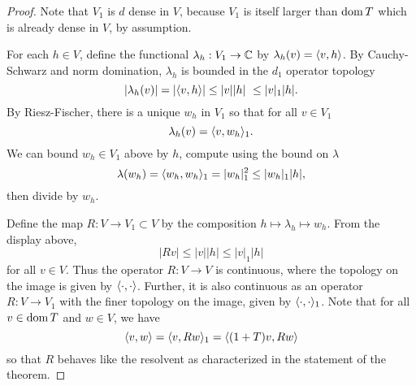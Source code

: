 \documentclass[11pt]{amsart}
\begin{document}
\begin{proof}
		Note that $V_1$ is $d$ dense in $V$, because $V_1$ is itself larger than $\operatorname{dom} T$ which is already dense in $V$, by assumption.
		
		For each $h\in V$, define the functional $\lambda_h: V_1 \to \mathbb{C}$ by $\lambda_h(v)=\langle v, h \rangle$. By Cauchy-Schwarz and norm domination, $\lambda_h$ is bounded in the $d_1$ operator topology
			\begin{equation*}
				|\lambda_h(v)|=|\langle v, h \rangle| \leq |v| |h|\ \leq |v|_1 |h|.
			\end{equation*}
		By Riesz-Fischer, there is a unique $w_h$ in $V_1$ so that for all $v \in V_1$
			\begin{equation*}
				\lambda_h (v) = \langle v, w_h \rangle_1.
			\end{equation*}
		We can bound $w_h\in V_1$ above by $h$, compute using the bound on $\lambda$
			\begin{equation*}
				\lambda(w_h)=\langle w_h, w_h \rangle_1=|w_h|_1^2\leq |w_h|_1|h|,
			\end{equation*}
		then divide by $w_h$. 
		
		Define the map $R:V\to V_1\subset V$ by the composition $h\mapsto \lambda _h \mapsto w_h$. From the display above, 
			\begin{equation*}
				|Rv|\leq |v||h|\leq |v|_1|h|
			\end{equation*}
		for all $v\in V$. Thus the operator $R:V\to V$ is continuous, where the topology on the image is given by $\langle \cdot, \cdot \rangle$. Further, it is also continuous as an operator $R:V\to V_1$ with the finer topology on the image, given by $\langle \cdot, \cdot \rangle_1$. 
			Note that for all $v\in \operatorname{dom} T$ and $w \in V$, we have 
			\begin{equation*}
				\langle v, w \rangle=\langle v, Rw \rangle_1=\langle (1+T)v, Rw \rangle
			\end{equation*} 
		so that $R$ behaves like the resolvent as characterized in the statement of the theorem.
		

\end{proof}
\end{document}
